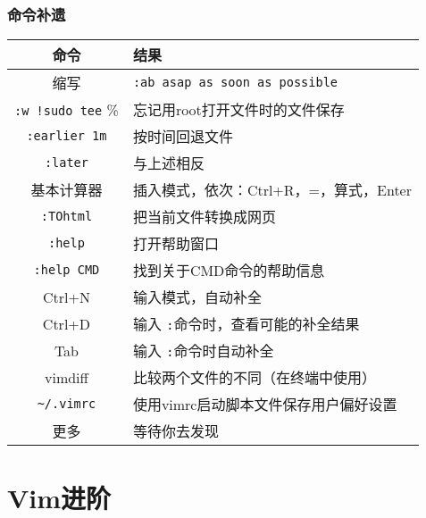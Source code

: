 \begin{frame}[fragile]
  \frametitle{命令补遗}
  \begin{table}
    \centering
    \begin{tabularx}{\textwidth}{cX}
      \hline
      \rowcolor{blue!50}命令 & 结果\\
      \hline
      缩写 & \verb|:ab asap as soon as possible|\\
      \hline
      \verb|:w !sudo tee| \% & 忘记用root打开文件时的文件保存\\
      \hline
      \verb|:earlier 1m| & 按时间回退文件\\ 
      \verb|:later| & 与上述相反\\ 
      \hline
      基本计算器 & 插入模式，依次：Ctrl+R，=，算式，Enter\\
      \hline
      \verb|:TOhtml| & 把当前文件转换成网页\\
      \hline
      \verb|:help| & 打开帮助窗口\\
      \verb|:help CMD| & 找到关于CMD命令的帮助信息\\
      \hline
      Ctrl+N & 输入模式，自动补全\\
      \hline
      Ctrl+D & 输入 \verb|:|命令时，查看可能的补全结果\\
      Tab & 输入 \verb|:|命令时自动补全\\
      \hline
      vimdiff & 比较两个文件的不同（在终端中使用）\\
      \verb|~/.vimrc| & 使用vimrc启动脚本文件保存用户偏好设置\\
      \hline
      更多 & 等待你去发现\\
      \hline
    \end{tabularx}
  \end{table}
\end{frame}

\section{Vim进阶}
